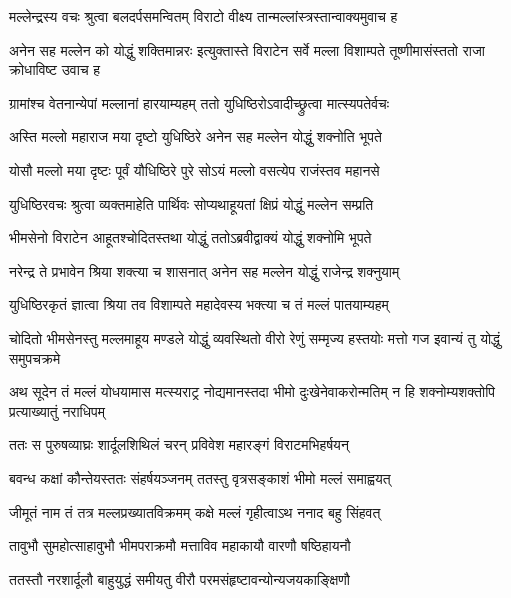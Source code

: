 \twolineshloka
{मल्लेन्द्रस्य वचः श्रुत्वा बलदर्पसमन्वितम्}
{विराटो वीक्ष्य तान्मल्लांस्त्रस्तान्वाक्यमुवाच ह}


\onelineshloka
{अनेन सह मल्लेन को योद्धुं शक्तिमान्नरः}
\twolineshloka
{इत्युक्तास्ते विराटेन सर्वे मल्ला विशाम्पते}
{तूष्णीमासंस्ततो राजा क्रोधाविष्ट उवाच ह}


\twolineshloka
{ग्रामांश्च वेतनान्येपां मल्लानां हारयाम्यहम्}
{ततो युधिष्ठिरोऽवादीच्छ्रुत्वा मात्स्यपतेर्वचः}


\twolineshloka
{अस्ति मल्लो महाराज मया दृष्टो युधिष्ठिरे}
{अनेन सह मल्लेन योद्धुं शक्नोति भूपते}


\twolineshloka
{योसौ मल्लो मया दृष्टः पूर्वं यौधिष्ठिरे पुरे}
{सोऽयं मल्लो वसत्येप राजंस्तव महानसे}



\twolineshloka
{युधिष्ठिरवचः श्रुत्वा व्यक्तमाहेति पार्थिवः}
{सोप्यथाहूयतां क्षिप्रं योद्धुं मल्लेन सम्प्रति}


\twolineshloka
{भीमसेनो विराटेन आहूतश्चोदितस्तथा}
{योद्धुं ततोऽब्रवीद्वाक्यं योद्धुं शक्नोमि भूपते}


\twolineshloka
{नरेन्द्र ते प्रभावेन श्रिया शक्त्या च शासनात्}
{अनेन सह मल्लेन योद्धुं राजेन्द्र शक्नुयाम्}


\twolineshloka
{युधिष्ठिरकृतं ज्ञात्वा श्रिया तव विशाम्पते}
{महादेवस्य भक्त्या च तं मल्लं पातयाम्यहम्}



\threelineshloka
{चोदितो भीमसेनस्तु मल्लमाहूय मण्डले}
{योद्धुं व्यवस्थितो वीरो रेणुं सम्मृज्य हस्तयोः}
{मत्तो गज इवान्यं तु योद्धुं समुपचक्रमे}


\onelineshloka
{अथ सूदेन तं मल्लं योधयामास मत्स्यराट्र}
\twolineshloka
{नोद्यमानस्तदा भीमो दुःखेनेवाकरोन्मतिम्}
{न हि शक्नोम्यशक्तोपि प्रत्याख्यातुं नराधिपम्}


\twolineshloka
{ततः स पुरुषव्याघ्रः शार्दूलशिथिलं चरन्}
{प्रविवेश महारङ्गं विराटमभिहर्षयन्}


\twolineshloka
{बवन्ध कक्षां कौन्तेयस्ततः संहर्षयञ्जनम्}
{ततस्तु वृत्रसङ्काशं भीमो मल्लं समाह्वयत्}


\twolineshloka
{जीमूतं नाम तं तत्र मल्लप्रख्यातविक्रमम्}
{कक्षे मल्लं गृहीत्वाऽथ ननाद बहु सिंहवत्}


\twolineshloka
{तावुभौ सुमहोत्साहावुभौ भीमपराक्रमौ}
{मत्ताविव महाकायौ वारणौ षष्ठिहायनौ}


\twolineshloka
{ततस्तौ नरशार्दूलौ बाहुयुद्धं समीयतु}
{वीरौ परमसंहृष्टावन्योन्यजयकाङ्क्षिणौ}


